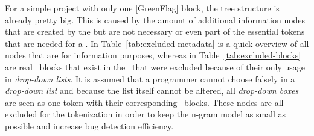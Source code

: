 For a simple \scratch{} project with only one [GreenFlag] block, the tree structure is already pretty big. This is caused by the amount of additional information nodes that are created by the \litterbox{} \AST{} but are not necessary or even part of the essential tokens that are needed for a \ngram{}. In Table~\ref{tab:excluded-metadata} is a quick overview of all  nodes that are for information purposes, whereas in Table~\ref{tab:excluded-blocks} are real \scratch\ blocks that exist in the \AST\ that were excluded because of their only usage in \textit{drop-down lists}. It is assumed that a programmer cannot choose falsely in a \textit{drop-down list} and because the list itself cannot be altered, all \textit{drop-down boxes} are seen as one token with their corresponding \scratch\ blocks. These nodes are all excluded for the tokenization in order to keep the n-gram model as small as possible and increase bug detection efficiency.   

